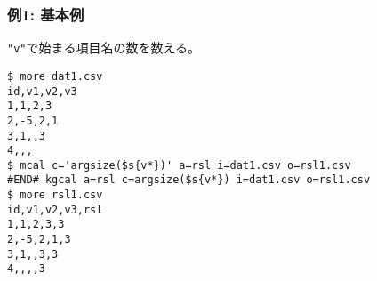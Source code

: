 \subsubsection*{例1: 基本例}

\verb|"v"|で始まる項目名の数を数える。


\begin{Verbatim}[baselinestretch=0.7,frame=single]
$ more dat1.csv
id,v1,v2,v3
1,1,2,3
2,-5,2,1
3,1,,3
4,,,
$ mcal c='argsize($s{v*})' a=rsl i=dat1.csv o=rsl1.csv
#END# kgcal a=rsl c=argsize($s{v*}) i=dat1.csv o=rsl1.csv
$ more rsl1.csv
id,v1,v2,v3,rsl
1,1,2,3,3
2,-5,2,1,3
3,1,,3,3
4,,,,3
\end{Verbatim}
